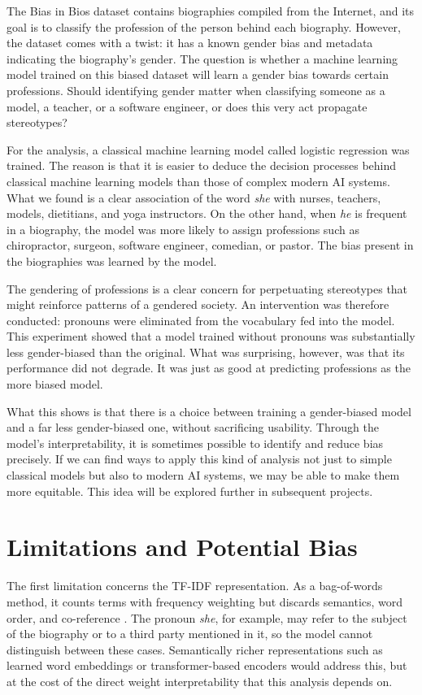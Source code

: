 \documentclass[11pt, a4paper]{article}
\begin{document}
The Bias in Bios dataset contains biographies compiled from the Internet, 
and its goal is to classify the profession of the person behind each 
biography. However, the dataset comes with a twist: it has a known gender 
bias and metadata indicating the biography's gender. The question is 
whether a machine learning model trained on this biased dataset will learn 
a gender bias towards certain professions. Should identifying gender matter 
when classifying someone as a model, a teacher, or a software engineer, or 
does this very act propagate stereotypes?

For the analysis, a classical machine learning model called logistic 
regression was trained. The reason is that it is easier to deduce the 
decision processes behind classical machine learning models than those of 
complex modern AI systems. What we found is a clear association of the word 
\textit{she} with nurses, teachers, models, dietitians, and yoga 
instructors. On the other hand, when \textit{he} is frequent in a 
biography, the model was more likely to assign professions such as 
chiropractor, surgeon, software engineer, comedian, or pastor. The bias 
present in the biographies was learned by the model.

The gendering of professions is a clear concern for perpetuating stereotypes 
that might reinforce patterns of a gendered society. An intervention was 
therefore conducted: pronouns were eliminated from the vocabulary fed into 
the model. This experiment showed that a model trained without pronouns was 
substantially less gender-biased than the original. What was surprising, 
however, was that its performance did not degrade. It was just as good at 
predicting professions as the more biased model.

What this shows is that there is a choice between training a gender-biased 
model and a far less gender-biased one, without sacrificing usability. 
Through the model's interpretability, it is sometimes possible to identify 
and reduce bias precisely. If we can find ways to apply this kind of 
analysis not just to simple classical models but also to modern AI systems, 
we may be able to make them more equitable. This idea will be explored 
further in subsequent projects.

\section{Limitations and Potential Bias}

The first limitation concerns the TF-IDF representation. As a bag-of-words 
method, it counts terms with frequency weighting but discards semantics, 
word order, and co-reference \citep{schutze2008introduction}. The pronoun 
\textit{she}, for example, may refer to the subject of the biography or to 
a third party mentioned in it, so the model cannot distinguish between these 
cases. Semantically richer representations such as learned word embeddings 
or transformer-based encoders would address this, but at the cost of the 
direct weight interpretability that this analysis depends on.
\end{document}
